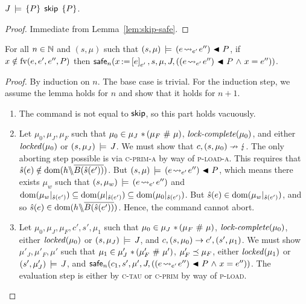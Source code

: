 \documentclass[11pt]{report}
\begin{document}
\begin{lemma}
	\label{lem:skip-sound}
	$J\,\models\,\left\lbrace P \right\rbrace\;\operatorname{\mathsf{skip}}\;\left\lbrace P \right\rbrace$. 
\end{lemma}

\begin{proof}
	Immediate from Lemma~\ref{lem:skip-safe}. 
\end{proof}

\begin{lemma}
	\label{lem:load-safe}
	For all $n \in \mathbb{N}$ and $(s,\mu)$ such that $(s,\mu) \,\models\, (e \!\leadsto_{e'}\! e'') \operatorname{\,\blacktriangleleft\,} P$, if $x \notin \mathrm{fv}(e,e',e'',P)$ then $\mathsf{safe}_{n}(x \operatorname{:\!=} \left[ e \right]_{e'},s,\mu,J,\left((e \!\leadsto_{e'}\! e'') \operatorname{\,\blacktriangleleft\,} P \operatorname{\,\wedge\,} x = e''\right))$. 
\end{lemma}

\begin{proof}
	By induction on $n$. The base case is trivial. For the induction step, we assume the lemma holds for $n$ and show that it holds for $n+1$.

	\begin{enumerate}
		\item The command is not equal to $\operatorname{\mathsf{skip}}$, so this part holds vacuously. 

		\item Let $\mu_0,\mu_J,\mu_F$ such that $\mu_0 \in \mu_J \operatorname{\,\ast\,} (\mu_F \operatorname{\,\#\,} \mu)$, $\text{\textit{lock-complete}}(\mu_0)$, and either $\mathit{locked}(\mu_0)$ or $(s,\mu_J) \,\models\, J$. We must show that $c,(s,\mu_0) \nrightarrow \lightning$. The only aborting step possible is via \textsc{c-prim-a} by way of \textsc{p-load-a}. This requires that $\hat{s}(e) \notin \operatorname{\mathrm{dom}}(h \backslash\!\!\backslash \overline{B(\hat{s}(e'))})$. But $(s,\mu) \,\models\, (e \!\leadsto_{e'}\! e'') \operatorname{\,\blacktriangleleft\,} P$, which means there exists $\mu_w$ such that $(s,\mu_w) \,\models\, (e \!\leadsto_{e'}\! e'')$ and $\operatorname{\mathrm{dom}}(\mu_w |_{\hat{s}(e')}) \subseteq \operatorname{\mathrm{dom}}(\mu |_{\hat{s}(e')}) \subseteq \operatorname{\mathrm{dom}}(\mu_0 |_{\hat{s}(e')})$. But $\hat{s}(e) \in \operatorname{\mathrm{dom}}(\mu_w |_{\hat{s}(e')})$, and so $\hat{s}(e) \in \operatorname{\mathrm{dom}}(h \backslash\!\!\backslash \overline{B(\hat{s}(e'))})$. Hence, the command cannot abort. 

		\item Let $\mu_0,\mu_J,\mu_F,c',s',\mu_1$ such that $\mu_0 \in \mu_J \operatorname{\,\ast\,} (\mu_F \operatorname{\,\#\,} \mu)$, $\text{\textit{lock-complete}}(\mu_0)$, either $\mathit{locked}(\mu_0)$ or $(s,\mu_J) \,\models\, J$, and $c,(s,\mu_0) \rightarrow c',(s',\mu_1)$. We must show $\mu'_J,\mu'_F,\mu'$ such that $\mu_1 \in \mu'_J \operatorname{\,\ast\,} (\mu'_F \operatorname{\,\#\,} \mu')$, $\mu'_F \preceq \mu_F$, either $\mathit{locked}(\mu_1)$ or $(s',\mu'_J) \,\models\, J$, and $\mathsf{safe}_{n}(c_1,s',\mu',J,((e \!\leadsto_{e'}\! e'') \operatorname{\,\blacktriangleleft\,} P \operatorname{\,\wedge\,} x = e''))$. The evaluation step is either by \textsc{c-tau} or \textsc{c-prim} by way of \textsc{p-load}. 


\end{enumerate}
\end{proof}
\end{document}
